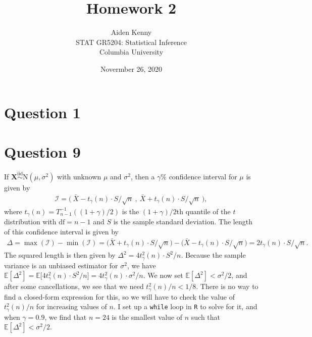 \documentclass[10pt]{article}
\title{
    {\Large Homework 2}
}
\author{
    {\normalsize Aiden Kenny}\\
    {\normalsize STAT GR5204: Statistical Inference}\\
    {\normalsize Columbia University}
}
\date{\normalsize Novermber 26, 2020}
\begin{document}
\maketitle

\section{Question 1} \noindent


\section{Question 9} \noindent
If \(\bm{X} \overset{\mathrm{iid}}{\sim} \mathrm{N}(\mu, \sigma^2)\) with unknown \(\mu\) and \(\sigma^2\), then a \(\gamma\)\%{} confidence interval
for \(\mu\) is given by 
\begin{align*}
    \mathcal{I} = \Big( ~\bar{X} - t_{\gamma}(n) \cdot S / \sqrt{n} ~,~ \bar{X} + t_{\gamma}(n) \cdot S / \sqrt{n} ~ \Big),
\end{align*}
where \(t_{\gamma}(n) = T_{n-1}^{-1} ( (1 + \gamma) / 2 )\) is the \((1 + \gamma) / 2\)th quantile of the \(t\) distribution with \(\mathrm{df} = n-1\) and \(S\)
is the sample standard deviation. 
The length of this confidence interval is given by 
\begin{align*}
    \Delta 
    = \max (\mathcal{I}) - \min (\mathcal{I})
    = \Big( \bar{X} + t_{\gamma}(n) \cdot S / \sqrt{n} \Big) - \Big( \bar{X} - t_{\gamma}(n) \cdot S / \sqrt{n} \Big)
    = 2 t_{\gamma}(n) \cdot S / \sqrt{n}.
\end{align*}
The squared length is then given by \(\Delta^2 = 4 t_{\gamma}^2(n) \cdot S^2 / n\). 
Because the sample variance is an unbiased estimator for \(\sigma^2\), we have \(\mathbb{E}[\Delta^2] = \mathbb{E} \big[ 4 t_{\gamma}^2(n) \cdot S^2 / n \big] = 4 t_{\gamma}^2(n) \cdot \sigma^2 / n\).
We now set \(\mathbb{E}[\Delta^2] < \sigma^2 / 2\), and after some cancellations, we see that we need \(t_{\gamma}^2(n) / n < 1/8\). There is no way to find a
closed-form expression for this, so we will have to check the value of \(t_{\gamma}^2(n) / n\) for increasing values of \(n\). I set up a \texttt{while} 
loop in \texttt{R} to solve for it, and when \(\gamma = 0.9\), we find that \(n = 24\) is the smallest value of \(n\) such that \(\mathbb{E}[\Delta^2] < \sigma^2 / 2\).
\end{document}
